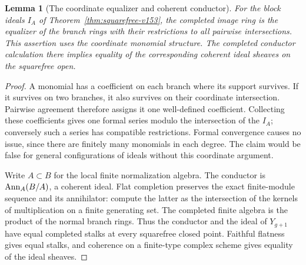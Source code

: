 \documentclass[11pt,reqno]{amsart}
\numberwithin{equation}{section}
\newtheorem{lemma}[theorem]{Lemma}
\theoremstyle{definition}\newtheorem{definition}[theorem]{Definition}
\theoremstyle{remark}\newtheorem{remark}[theorem]{Remark}
\begin{document}
\begin{lemma}[The coordinate equalizer and coherent conductor]
\label{lem:equalizer-v154}
For the block ideals $I_A$ of Theorem~\ref{thm:squarefree-v153},
the completed image ring is the equalizer of the branch rings with
their restrictions to all pairwise intersections. This assertion
uses the coordinate monomial structure. The completed conductor
calculation there implies equality of the corresponding coherent
ideal sheaves on the squarefree open.
\end{lemma}
\begin{proof}
A monomial has a coefficient on each branch where its support
survives. If it survives on two branches, it also survives on their
coordinate intersection. Pairwise agreement therefore assigns it
one well-defined coefficient. Collecting these coefficients gives
one formal series modulo the intersection of the $I_A$; conversely
such a series has compatible restrictions. Formal convergence causes
no issue, since there are finitely many monomials in each degree.
The claim would be false for general configurations of ideals without
this coordinate argument.

Write $A\subset B$ for the local finite normalization algebra.
The conductor is $\operatorname{Ann}_A(B/A)$, a coherent ideal. Flat completion
preserves the exact finite-module sequence and its annihilator:
compute the latter as the intersection of the kernels of multiplication
on a finite generating set. The completed finite algebra is the
product of the normal branch rings. Thus the conductor and the ideal
of $Y_{g+1}$ have equal completed stalks at every squarefree closed
point. Faithful flatness gives equal stalks, and coherence on a
finite-type complex scheme gives equality of the ideal sheaves.
\end{proof}
\end{document}
